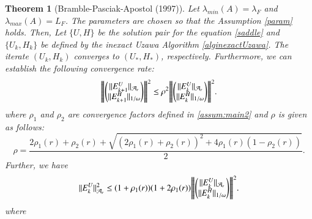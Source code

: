 \documentclass{article}
\newtheorem{theorem}{Theorem}
\newcommand{\vertiii}[1]{{\left\vert\kern-0.25ex\left\vert\kern-0.25ex\left\vert #1 
    \right\vert\kern-0.25ex\right\vert\kern-0.25ex\right\vert}}
\theoremstyle{definition}
\begin{document}
\begin{theorem}[Bramble-Pasciak-Apostol (1997)] 
Let $\lambda_{min}(A) = \lambda_F$ and $\lambda_{max}(A) = L_F$. The parameters are chosen so that the Assumption \ref{param} holds. Then, 
Let $\{U,H\}$ be the solution pair for the equation \eqref{saddle} and $\{U_k,H_k\}$ be defined by the inexact Uzawa Algorithm \ref{alginexactUzawa}. The iterate $(U_k,H_k)$ converges to $(U_*,H_*)$, respectively. Furthermore, 
we can establish the following convergence rate: 
\begin{eqnarray}
\vertiii{ \begin{pmatrix} \|E^U_{k+1}\|_{\mathcal{A}_r} \\
\|E^H_{k+1}\|_{1/\omega} \end{pmatrix} }^2 \leq \rho^{2} \vertiii{\begin{pmatrix} \|E^U_{k}\|_{\mathcal{A}_r} \\\|E^H_{k}\|_{1/\omega}\end{pmatrix} }^2.
\end{eqnarray}
where $\rho_1$ and $\rho_2$ are convergence factors defined in \eqref{assum:main2}
and $\rho$ is given as follows: 
\begin{equation}
\rho = \frac{2\rho_1(r) + \rho_2(r) + \sqrt{ (2\rho_1(r) + \rho_2(r))^2 + 4\rho_1(r)(1-\rho_2(r))}}{2}. 
\end{equation} 
Further, we have 
\begin{eqnarray}
\|E_k^U\|^2_{\mathcal{A}_r} \leq (1 + \rho_1(r))(1 + 2\rho_1(r))\vertiii{\begin{pmatrix} \|E^U_{k}\|_{\mathcal{A}_r} \\\|E^H_{k}\|_{1/\omega}\end{pmatrix} }^2.%
\end{eqnarray}
where 
\end{theorem}
\end{document}
